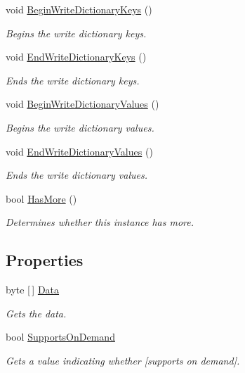 \begin{DoxyCompactItemize}
void \hyperlink{class_serialization_1_1_binary_serializer_afb882e22e8a0215c525810ea8c2375d8}{Begin\+Write\+Dictionary\+Keys} ()
\begin{DoxyCompactList}\small\item\em Begins the write dictionary keys. \end{DoxyCompactList}\item 
void \hyperlink{class_serialization_1_1_binary_serializer_a53b70a443f3bddc10ab34444ab58b08e}{End\+Write\+Dictionary\+Keys} ()
\begin{DoxyCompactList}\small\item\em Ends the write dictionary keys. \end{DoxyCompactList}\item 
void \hyperlink{class_serialization_1_1_binary_serializer_af0bf198e95f7bac8d27a41d4dbf9a7ce}{Begin\+Write\+Dictionary\+Values} ()
\begin{DoxyCompactList}\small\item\em Begins the write dictionary values. \end{DoxyCompactList}\item 
void \hyperlink{class_serialization_1_1_binary_serializer_a73fd29b68829c4662864e9f922800c1f}{End\+Write\+Dictionary\+Values} ()
\begin{DoxyCompactList}\small\item\em Ends the write dictionary values. \end{DoxyCompactList}\item 
bool \hyperlink{class_serialization_1_1_binary_serializer_a17489c518844ba789eed665e716db38d}{Has\+More} ()
\begin{DoxyCompactList}\small\item\em Determines whether this instance has more. \end{DoxyCompactList}\end{DoxyCompactItemize}
\subsection*{Properties}
\begin{DoxyCompactItemize}
\item 
byte \mbox{[}$\,$\mbox{]} \hyperlink{class_serialization_1_1_binary_serializer_a52da00a6deec8ded666bc8de60009519}{Data}
\begin{DoxyCompactList}\small\item\em Gets the data. \end{DoxyCompactList}\item 
bool \hyperlink{class_serialization_1_1_binary_serializer_adfc81495319b13b39a24b79993e51213}{Supports\+On\+Demand}
\begin{DoxyCompactList}\small\item\em Gets a value indicating whether \mbox{[}supports on demand\mbox{]}. \end{DoxyCompactList}\end{DoxyCompactItemize}


